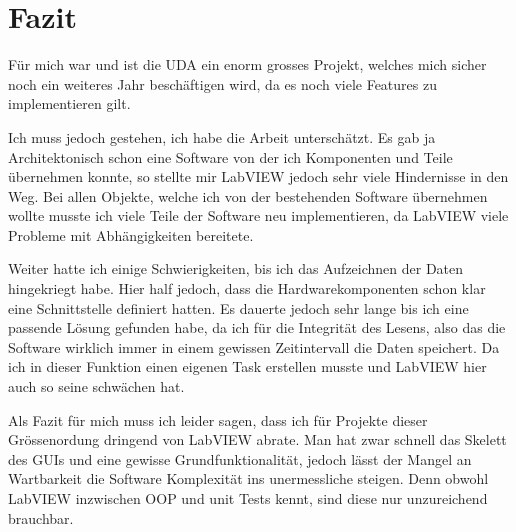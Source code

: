\documentclass[10pt]{scrartcl}
\begin{document}
\section{Fazit}
Für mich war und ist die UDA ein enorm grosses Projekt, welches mich sicher noch ein weiteres Jahr beschäftigen wird, da es noch viele Features zu implementieren gilt.

Ich muss jedoch gestehen, ich habe die Arbeit unterschätzt. Es gab ja Architektonisch schon eine Software von der ich Komponenten und Teile übernehmen konnte, so stellte mir \gls{LabVIEW} jedoch sehr viele Hindernisse in den Weg. Bei allen Objekte, welche ich von der bestehenden Software übernehmen wollte musste ich viele Teile der Software neu implementieren, da \gls{LabVIEW} viele Probleme mit Abhängigkeiten bereitete.

Weiter hatte ich einige Schwierigkeiten, bis ich das Aufzeichnen der Daten hingekriegt habe. Hier half jedoch, dass die Hardwarekomponenten schon klar eine Schnittstelle definiert hatten. Es dauerte jedoch sehr lange bis ich eine passende Lösung gefunden habe, da ich für die Integrität des Lesens, also das die Software wirklich immer in einem gewissen Zeitintervall die Daten speichert. Da ich in dieser Funktion einen eigenen Task erstellen musste und \gls{LabVIEW} hier auch so seine schwächen hat.

Als Fazit für mich muss ich leider sagen, dass ich für Projekte dieser Grössenordung dringend von \gls{LabVIEW} abrate. Man hat zwar schnell das Skelett des GUIs und eine gewisse Grundfunktionalität, jedoch lässt der Mangel an Wartbarkeit die Software Komplexität ins unermessliche steigen. Denn obwohl \gls{LabVIEW} inzwischen OOP und unit Tests kennt, sind diese nur unzureichend brauchbar.
\end{document}
